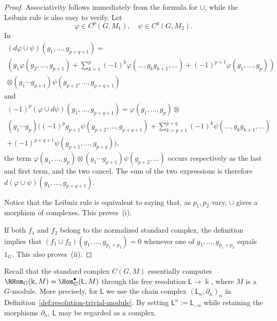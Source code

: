 \begin{proof}
	Associativity follows immediately from the formula for $\cup$, while the
	Leibniz rule is also easy to verify. Let
	\[ \varphi \in C^p(G, M_1), \quad \psi \in C^q(G, M_2). \]
	In
	\begin{multline*}
		(d\varphi \cup \psi)(g_1, \ldots, g_{p+q+1}) = \\
		\left( g_1 \varphi(g_2, \ldots, g_{p+1}) + \sum_{k=1}^p (-1)^k \varphi(\ldots, g_k g_{k+1}, \ldots) + (-1)^{p+1} \varphi(g_1, \ldots, g_p) \right) \\
		\otimes (g_1 \cdots g_{p+1}) \psi(g_{p+2}, \ldots, g_{p+q+1})
	\end{multline*}
and
	\begin{multline*}
		(-1)^p (\varphi \cup d\psi)(g_1, \ldots, g_{p+q+1}) = \varphi(g_1, \ldots, g_p) \otimes \\
		(g_1 \cdots g_p) \bigg( (-1)^p g_{p+1} \psi(g_{p+2}, \ldots, g_{p+q+1}) + \sum_{k=p+1}^{p+q} (-1)^k \psi(\ldots, g_k g_{k+1}, \ldots) \\
		+ (-1)^{p+q+1} \psi(g_{p+1}, \ldots, g_{p+q}) \bigg),
	\end{multline*}
	the term
	$\varphi(g_1,\ldots,g_p)\otimes(g_1\cdots g_{p+1})
	\psi(g_{p+2},\ldots)$ occurs respectively as the last and first term,
	and the two cancel. The sum of the two expressions is therefore
	$d(\varphi\cup\psi)(g_1,\ldots,g_{p+q+1})$.

	Notice that the Leibniz rule is equivalent to saying that, as $p_1,p_2$
	vary, $\cup$ gives a morphism of complexes. This proves~(i).

	If both $f_1$ and $f_2$ belong to the normalized standard complex, the
	definition implies that
	$(f_1\cup f_2)(g_1,\ldots,g_{p_1+p_2})=0$ whenever one of
	$g_1,\ldots,g_{p_1+p_2}$ equals $1_G$. This also proves~(ii).
\end{proof}

Recall that the standard complex $C(G,M)$ essentially computes
$\RHom_G(\Bbbk,M)=\Hom_G^\bullet(\mathsf{L},M)$ through the free resolution
$\mathsf{L}\to\Bbbk$, where $M$ is a $G$-module. More precisely, for
$\mathsf{L}$ we use the chain complex $(\mathsf{L}_n,\partial_n)_n$ in
Definition~\ref{def:resolution-trivial-module}. By setting
$\mathsf{L}^n:=\mathsf{L}_{-n}$ while retaining the morphisms $\partial_n$,
$\mathsf{L}$ may be regarded as a complex.

